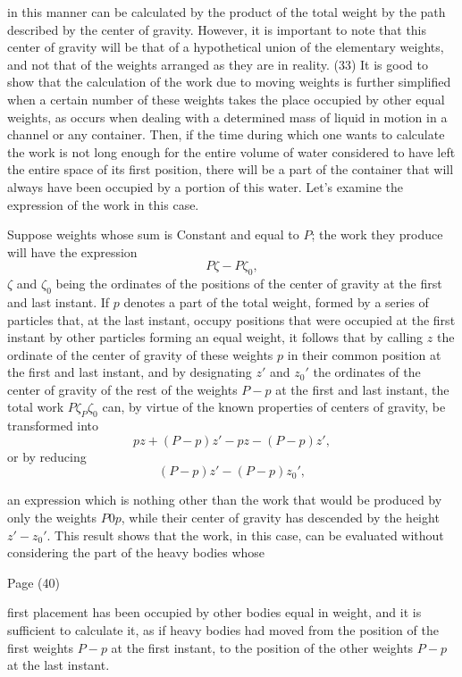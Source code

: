 \documentclass{book}
\begin{document}
\newpage

in this manner can be calculated by the product of the total weight by the path described by the center of gravity. However, it is important to note that this center of gravity will be that of a hypothetical union of the elementary weights, and not that of the weights arranged as they are in reality.
(33)
It is good to show that the calculation of the work due to moving weights is further simplified when a certain number of these weights takes the place occupied by other equal weights, as occurs when dealing with a determined mass of liquid in motion in a channel or any container. Then, if the time during which one wants to calculate the work is not long enough for the entire volume of water considered to have left the entire space of its first position, there will be a part of the container that will always have been occupied by a portion of this water. Let's examine the expression of the work in this case.

Suppose weights whose sum is Constant and equal to \(P\); the work they produce will have the expression \[P\zeta−P\zeta_0,\] \(\zeta\) and \(\zeta_0\) being the ordinates of the positions of the center of gravity at the first and last instant. If \(p\) denotes a part of the total weight, formed by a series of particles that, at the last instant, occupy positions that were occupied at the first instant by other particles forming an equal weight, it follows that by calling \(z\) the ordinate of the center of gravity of these weights \(p\) in their common position at the first and last instant, and by designating \(z'\) and \(z_0'\) the ordinates of the center of gravity of the rest of the weights 
\(P-p\) at the first and last instant, the total work \(P\zeta_P\zeta_0\) can, by virtue of the known properties of centers of gravity, be transformed into
\[pz+(P-p)z'-pz-(P-p)z',\]  
or by reducing
\[(P-p)z'-(P-p)z_0',\]  


an expression which is nothing other than the work that would be produced by only the weights \(P0p\), while their center of gravity has descended by the height \(z'-z_0'\). This result shows that the work, in this case, can be evaluated without considering the part of the heavy bodies whose 

\newpage
Page (40) \\
\begin{comment}
This passage describes the calculation of work in fluid dynamics, particularly with water flow in canals, and introduces the concept of work due to mutual reactions, using the example of repulsive forces in a spring system.
\end{comment}
first placement has been occupied by other bodies equal in weight, and it is sufficient to calculate it, as if heavy bodies had moved from the position of the first weights \(P-p\) at the first instant, to the position of the other weights \(P-p\) at the last instant.
\end{document}
